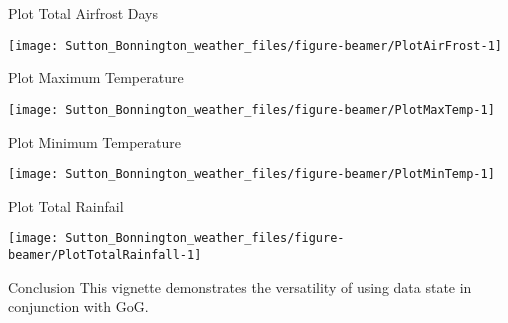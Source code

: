 \documentclass[
  ignorenonframetext,
]{beamer}
\begin{document}
\begin{frame}{Plot Total Airfrost Days}
\protect\hypertarget{plot-total-airfrost-days}{}
\begin{center}\texttt{[image: Sutton\_Bonnington\_weather\_files/figure-beamer/PlotAirFrost-1]} \end{center}
\end{frame}

\begin{frame}{Plot Maximum Temperature}
\protect\hypertarget{plot-maximum-temperature}{}
\begin{center}\texttt{[image: Sutton\_Bonnington\_weather\_files/figure-beamer/PlotMaxTemp-1]} \end{center}
\end{frame}

\begin{frame}{Plot Minimum Temperature}
\protect\hypertarget{plot-minimum-temperature}{}
\begin{center}\texttt{[image: Sutton\_Bonnington\_weather\_files/figure-beamer/PlotMinTemp-1]} \end{center}
\end{frame}

\begin{frame}{Plot Total Rainfail}
\protect\hypertarget{plot-total-rainfail}{}
\begin{center}\texttt{[image: Sutton\_Bonnington\_weather\_files/figure-beamer/PlotTotalRainfall-1]} \end{center}
\end{frame}

\begin{frame}{Conclusion}
\protect\hypertarget{conclusion}{}
This vignette demonstrates the versatility of using data state in
conjunction with GoG.
\end{frame}
\end{document}
